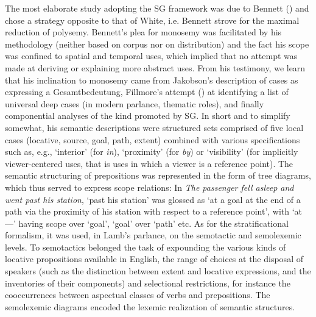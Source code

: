 \documentclass[output=paper]{langscibook}
\begin{document}
The most elaborate study adopting the SG framework was due to Bennett (\citeyear{bennett_spatial_1975}) and chose a strategy opposite to that of White, i.e. Bennett strove for the maximal reduction of polysemy. Bennett’s plea for monosemy was facilitated by his methodology (neither based on corpus nor on distribution) and the fact his scope was confined to spatial and temporal uses, which implied that no attempt was made at deriving or explaining more abstract uses. From his testimony, we learn that his inclination to monosemy came from Jakobson’s description of cases as expressing a Gesamtbedeutung, Fillmore’s attempt (\citeyear{bach_case_1968}) at identifying a list of universal deep cases (in modern parlance, thematic roles), and finally componential analyses of the kind promoted by SG. In short and to simplify somewhat, his semantic descriptions were structured sets comprised of five local cases (locative, source, goal, path, extent) combined with various specifications such as, e.g., ‘interior’ (for \textit{in}), ‘proximity’ (for \textit{by}) or ‘visibility’ (for implicitly viewer-centered uses, that is uses in which a viewer is a reference point). The semantic structuring of prepositions was represented in the form of tree diagrams, which thus served to express scope relations: In \textit{The passenger fell asleep and went past his station}, ‘past his station’ was glossed as ‘at a goal at the end of a path via the proximity of his station with respect to a reference point’, with ‘at —’ having scope over ‘goal’, ‘goal’ over ‘path’ etc. As for the stratificational formalism, it was used, in Lamb’s parlance, on the semotactic and semolexemic levels. To semotactics belonged the task of expounding the various kinds of locative propositions available in English, the range of choices at the disposal of speakers (such as the distinction between extent and locative expressions, and the inventories of their components) and selectional restrictions, for instance the cooccurrences between aspectual classes of verbs and prepositions. The semolexemic diagrams encoded the lexemic realization of semantic structures.
\end{document}
